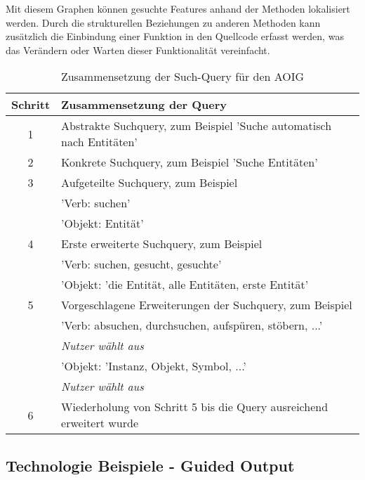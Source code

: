 \documentclass[runningheads,a4paper]{llncs}
\begin{document}
Mit diesem Graphen können gesuchte Features anhand der Methoden lokalisiert werden. Durch die strukturellen Beziehungen zu anderen Methoden kann zusätzlich die Einbindung einer Funktion in den Quellcode erfasst werden, was das Verändern oder Warten dieser Funktionalität vereinfacht.

\begin{table}[h]
	\centering
	\begin{tabular}{|c|l|}
		\hline
		\hspace{0.1cm} \textbf{Schritt} \hspace{0.1cm} & \textbf{Zusammensetzung der Query}\\
		\hline
		1 & Abstrakte Suchquery, zum Beispiel 'Suche automatisch nach Entitäten'\\
		\hline
		2 & Konkrete Suchquery, zum Beispiel 'Suche Entitäten'\\
		\hline
		3 & Aufgeteilte Suchquery, zum Beispiel\\
		& 'Verb: suchen'\\
		& 'Objekt: Entität'\\
		\hline
		4 & Erste erweiterte Suchquery, zum Beispiel\\
		& 'Verb: suchen, gesucht, gesuchte'\\
		& 'Objekt: 'die Entität, alle Entitäten, erste Entität'\\
		\hline
		5 & Vorgeschlagene Erweiterungen der Suchquery, zum Beispiel\\
		& 'Verb: absuchen, durchsuchen, aufspüren, stöbern, ...'\\
		& \textit{Nutzer wählt aus}\\
		& 'Objekt: 'Instanz, Objekt, Symbol, ...'\\
		& \textit{Nutzer wählt aus}\\
		\hline
		6 & Wiederholung von Schritt 5 bis die Query ausreichend erweitert wurde\\
		\hline
	\end{tabular}
	\vspace{0.2cm}
	\caption{Zusammensetzung der Such-Query für den \ac{AOIG}}
	\label{query}
\end{table}

\subsection*{Technologie Beispiele - Guided Output}
\end{document}
